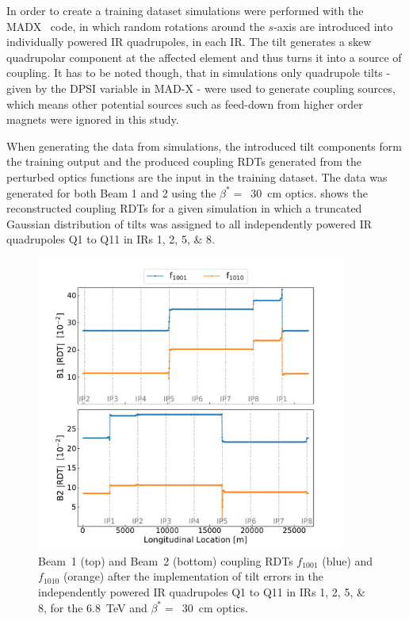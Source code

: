 In order to create a training dataset simulations were performed with the \gls{MADX}~\cite{CODE:MADX_guide} code, in which random rotations around the \(s\)-axis are introduced into individually powered IR quadrupoles, in each IR.
The tilt generates a \gls{skew} quadrupolar component at the affected element and thus turns it into a source of coupling.
It has to be noted though, that in simulations only quadrupole tilts - given by the DPSI variable in MAD-X - were used to generate coupling sources, which means other potential sources such as feed-down from higher order magnets were ignored in this study.

When generating the data from simulations, the introduced tilt components form the training output and the produced coupling \glspl{RDT} generated from the perturbed optics functions are the input in the training dataset.
The data was generated for both Beam 1 and 2 using the \(\beta^{\ast}=\)~\qty{30}{\centi\meter} optics.
 shows the reconstructed coupling RDTs for a given simulation in which a truncated Gaussian distribution of tilts was assigned to all independently powered IR quadrupoles Q\num{1} to Q\num{11} in IRs \numlist{1;2;5;8}.

\begin{figure}[!htb]
    \centering
    \includegraphics*[width=0.91\textwidth]{Figures/ML_for_IR_Coupling/ml_local_sources_rdts_combined.pdf}
    \caption{Beam~\num{1} (top) and Beam~\num{2} (bottom) coupling RDTs \(f_{1001}\) (\textcolor{mplblue}{blue}) and \(f_{1010}\) (\textcolor{mplorange}{orange}) after the implementation of tilt errors in the independently powered IR quadrupoles Q\num{1} to Q\num{11} in IRs \numlist{1;2;5;8}, for the \qty{6.8}{\tera\electronvolt} and \(\beta^{\ast}=\)~\qty{30}{\centi\meter} optics.}
    \label{figure:ml_local_sources_rdts}
\end{figure}

